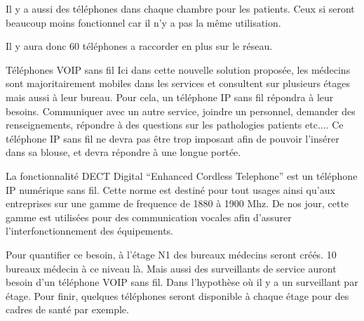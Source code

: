 



Il y a aussi des téléphones dans chaque chambre pour les patients. Ceux si seront beaucoup moins fonctionnel car il n’y a pas la même utilisation.


Il y aura donc 60 téléphones a raccorder en plus sur le réseau.
















Téléphones VOIP sans fil
Ici dans cette nouvelle solution proposée, les médecins sont majoritairement mobiles dans les services et consultent sur plusieurs étages mais aussi à leur bureau. Pour cela, un téléphone IP sans fil répondra à leur besoins. Communiquer avec un autre service, joindre un personnel, demander des renseignements, répondre à des questions sur les pathologies patients etc....
Ce téléphone IP sans fil ne devra pas être trop imposant afin de pouvoir l’insérer dans sa blouse, et devra répondre à une longue portée.


La fonctionnalité DECT Digital “Enhanced Cordless Telephone” est un téléphone IP numérique sans fil. Cette norme est destiné pour tout usages ainsi qu’aux entreprises sur une gamme de frequence de 1880 à 1900 Mhz. De nos jour, cette gamme est utilisées pour des communication vocales afin d’assurer l'interfonctionnement des équipements.


Pour quantifier ce besoin, à l’étage N1 des bureaux médecins seront créés. 10 bureaux médecin à ce niveau là. Mais aussi des surveillants de service auront besoin d’un téléphone VOIP sans fil. Dans l’hypothèse où il y a un surveillant par étage. Pour finir, quelques téléphones seront disponible à chaque étage pour des cadres de santé par exemple.




